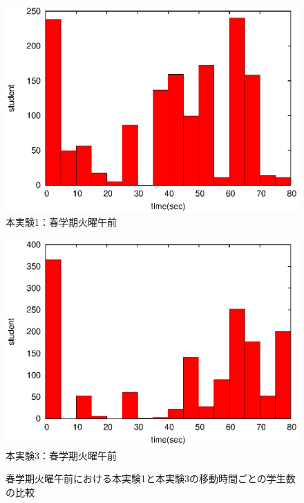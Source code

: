 \documentclass[12pt, a4paper, fleqn]{jreport}
\begin{document}
\begin{figure}[htpb]                        
\begin{minipage} {0.5\hsize}                             
\begin{center}                              
\includegraphics[bb=0 0 390 248,clip,width=\hsize]{oTu12_hist.eps}   
本実験1：春学期火曜午前
\end{center}                                    
\end{minipage}                                 
\begin{minipage}{0.5\hsize}                                            
\begin{center}                              
\includegraphics[bb=0 0 390 248,clip,width=\hsize]{oTu12_2_hist.eps}   
本実験3：春学期火曜午前
\end{center}                                    
\end{minipage}                                 
\caption{春学期火曜午前における本実験1と本実験3の移動時間ごとの学生数の比較}                              
\label{hikaku1-3}                                
\end{figure}                                 
\fi
\end{document}
